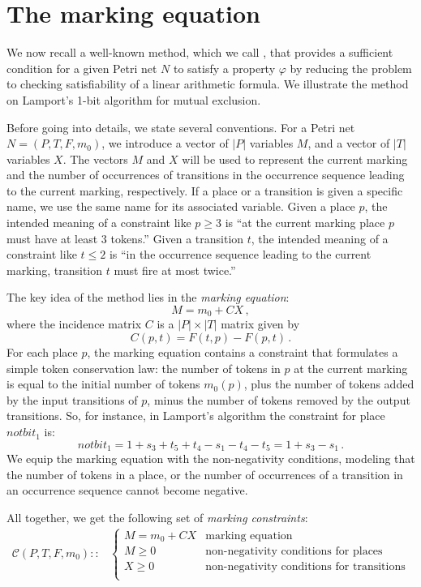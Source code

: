 \section{The marking equation}
\label{sec:the_marking_equation}

We now recall a well-known method, which we call \safety, that provides a sufficient
condition for a given Petri net $N$ to satisfy a property $\varphi$ 
by reducing the problem to checking satisfiability of a linear arithmetic formula.
We illustrate the method on Lamport's 1-bit algorithm for mutual
exclusion. 

Before going into details, we state several conventions. For a
Petri net $N = (P, T, F, m_0)$, we introduce a vector of
$|P|$ variables $M$, and a vector of $|T|$ variables $X$.
The vectors $M$ and $X$ will be used to represent the current
marking and the number of occurrences
of transitions in the occurrence sequence leading to the current marking, respectively.
If a place or a transition is given a specific
name, we use the same name for its associated variable. Given a place
$p$, the intended meaning of a constraint like $p \geq 3$ is 
``at the current marking place $p$ must have at least 3 tokens.'' 
Given a transition $t$, the intended meaning of a constraint like $t \leq 2$ is ``in
the occurrence sequence leading to the current marking, transition $t$
must fire at most twice.'' 

The key idea of the \safety{} method lies in the \emph{marking
  equation}:
$$M = m_0 + C X\,,$$
where the incidence matrix $C$ is a $|P| \times |T|$ matrix given by
$$C(p,t) = F(t,p) - F(p,t)\,.$$
For each place $p$, the marking equation contains a constraint
that formulates a simple token conservation law: the number of tokens in
$p$ at the current marking is equal to the initial number of tokens $m_0(p)$,
plus the number of tokens added by the input transitions of $p$, minus
the number of tokens removed by the output transitions. 
So, for instance, in Lamport's algorithm the constraint for place $notbit_1$
is:
$$notbit_1 = 1 + s_3 + t_5 + t_4 - s_1 - t_4 - t_5 = 1 +s_3 -s_1\,.$$
We equip the marking equation with the non-negativity conditions,
modeling that the number of tokens in a place, or the number of
occurrences of a transition in an occurrence sequence cannot become
negative.

All together, we get the following set of \emph{marking constraints}:
\begin{align*}
  \mathcal{C}(P, T, F, m_0) ::&
  \begin{cases}
    M = m_0 + C X  & \text{marking equation} \\
    M \ge 0        & \text{non-negativity conditions for places} \\
    X \ge 0        & \text{non-negativity conditions for transitions} \\
  \end{cases}
\end{align*}

